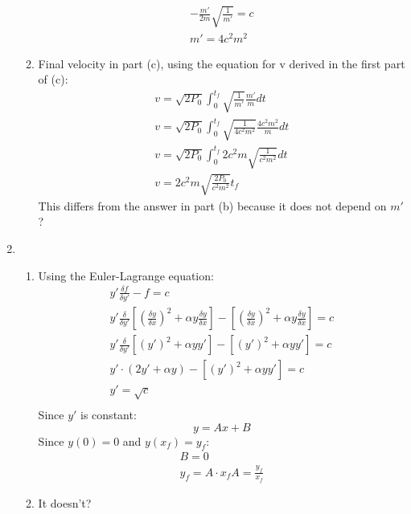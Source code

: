 \documentclass[12pt]{article}
\begin{document}
\begin{enumerate}
\begin{enumerate}
\begin{gather*}
                -\frac{m'}{2m}\sqrt{\frac{1}{m'}}=c\\
                m'=4c^2 m^2
            \end{gather*}
            \item
            Final velocity in part (c), using the equation for v derived in the first part of (c):
            \begin{gather*}
                v=\sqrt{2P_0}\int_0^{t_f}\sqrt{\frac{1}{m'}}\frac{m'}{m}dt\\
                v=\sqrt{2P_0}\int_0^{t_f}\sqrt{\frac{1}{4c^2 m^2}}\frac{4c^2 m^2}{m}dt\\
                v=\sqrt{2P_0}\int_0^{t_f}2 c^2 m \sqrt{\frac{1}{c^2 m^2}}dt\\
                v=2c^2 m\sqrt{\frac{2P_0}{c^2 m^2}}t_f
            \end{gather*}
            This differs from the answer in part (b) because it does not depend on $m'$?
        \end{enumerate}
        \item
        \begin{enumerate}
            \item
            Using the Euler-Lagrange equation:
            \begin{gather*}
                y'\frac{\delta f}{\delta y'}-f=c\\
                y'\frac{\delta}{\delta y'}\left[\left(\frac{\delta y}{\delta x}\right)^2+\alpha y\frac{\delta y}{\delta x}\right]-\left[\left(\frac{\delta y}{\delta x}\right)^2+\alpha y\frac{\delta y}{\delta x}\right]=c\\
                y'\frac{\delta}{\delta y'}\left[\left(y'\right)^2+\alpha yy'\right]-\left[\left(y'\right)^2+\alpha yy'\right]=c\\
                y'\cdot\left(2y'+\alpha y\right)-\left[\left(y'\right)^2+\alpha yy'\right]=c\\
                y'=\sqrt{c}\\
            \end{gather*}
            Since $y'$ is constant:
            \[
                y=Ax+B
            \]
            Since $y(0)=0$ and $y(x_f)=y_f$:
            \begin{gather*}
                B=0\\
                y_f=A\cdot x_f
                A=\frac{y_f}{x_f}
            \end{gather*}
            \item It doesn't?

\end{enumerate}
\end{enumerate}
\end{document}
